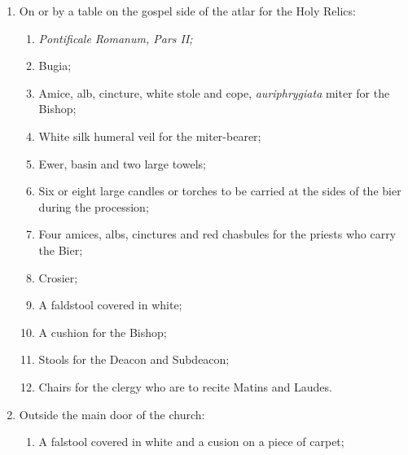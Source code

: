 \documentclass[letterpaper]{report}
\begin{document}
{\begin{enumerate}[label=\Roman*.]
        \item On or by a table on the gospel side of the atlar for the Holy
            Relics:

            \begin{enumerate}[label=\arabic*.]

                \item \textit{Pontificale Romanum, Pars II;}

                \item Bugia;

                \item Amice, alb, cincture, white stole and cope,
                    \textit{auriphrygiata} miter for the Bishop;

                \item White silk humeral veil for the miter-bearer;

                \item Ewer, basin and two large towels;

                \item Six or eight large candles or torches to be carried at
                    the sides of the bier during the procession;

                \item Four amices, albs, cinctures and red chasbules for the
                    priests who carry the Bier;

                \item Crosier;

                \item A faldstool covered in white;

                \item A cushion for the Bishop;

                \item Stools for the Deacon and Subdeacon;

                \item Chairs for the clergy who are to recite Matins and
                    Laudes.

            \end{enumerate}

        \item Outside the main door of the church:

            \begin{enumerate}[label=\arabic*.]
                
                \item A falstool covered in white and a cusion on a piece of
                    carpet;


\end{enumerate}
\end{enumerate}}
\end{document}

